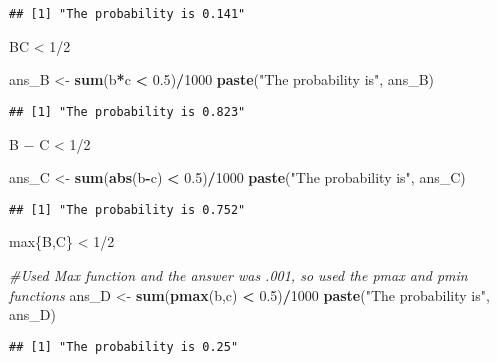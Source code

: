 \documentclass[
]{article}
\newenvironment{Shaded}{\begin{snugshade}}{\end{snugshade}}
\newcommand{\CommentTok}[1]{\textcolor[rgb]{0.56,0.35,0.01}{\textit{#1}}}
\newcommand{\DecValTok}[1]{\textcolor[rgb]{0.00,0.00,0.81}{#1}}
\newcommand{\FloatTok}[1]{\textcolor[rgb]{0.00,0.00,0.81}{#1}}
\newcommand{\KeywordTok}[1]{\textcolor[rgb]{0.13,0.29,0.53}{\textbf{#1}}}
\newcommand{\NormalTok}[1]{#1}
\newcommand{\OperatorTok}[1]{\textcolor[rgb]{0.81,0.36,0.00}{\textbf{#1}}}
\newcommand{\StringTok}[1]{\textcolor[rgb]{0.31,0.60,0.02}{#1}}
\begin{document}
\begin{verbatim}
## [1] "The probability is 0.141"
\end{verbatim}

BC \textless{} 1/2

\begin{Shaded}
\begin{Highlighting}[]
\NormalTok{ans_B <-}\StringTok{ }\KeywordTok{sum}\NormalTok{(b}\OperatorTok{*}\NormalTok{c }\OperatorTok{<}\StringTok{ }\FloatTok{0.5}\NormalTok{)}\OperatorTok{/}\DecValTok{1000}
\KeywordTok{paste}\NormalTok{(}\StringTok{"The probability is"}\NormalTok{, ans_B)}
\end{Highlighting}
\end{Shaded}

\begin{verbatim}
## [1] "The probability is 0.823"
\end{verbatim}

\textbar B − C\textbar{} \textless{} 1/2

\begin{Shaded}
\begin{Highlighting}[]
\NormalTok{ans_C <-}\StringTok{ }\KeywordTok{sum}\NormalTok{(}\KeywordTok{abs}\NormalTok{(b}\OperatorTok{-}\NormalTok{c) }\OperatorTok{<}\StringTok{ }\FloatTok{0.5}\NormalTok{)}\OperatorTok{/}\DecValTok{1000}
\KeywordTok{paste}\NormalTok{(}\StringTok{"The probability is"}\NormalTok{, ans_C)}
\end{Highlighting}
\end{Shaded}

\begin{verbatim}
## [1] "The probability is 0.752"
\end{verbatim}

max\{B,C\} \textless{} 1/2

\begin{Shaded}
\begin{Highlighting}[]
\CommentTok{#Used Max function and the answer was .001, so used the pmax and pmin functions}
\NormalTok{ans_D <-}\StringTok{ }\KeywordTok{sum}\NormalTok{(}\KeywordTok{pmax}\NormalTok{(b,c) }\OperatorTok{<}\StringTok{ }\FloatTok{0.5}\NormalTok{)}\OperatorTok{/}\DecValTok{1000}
\KeywordTok{paste}\NormalTok{(}\StringTok{"The probability is"}\NormalTok{, ans_D)}
\end{Highlighting}
\end{Shaded}

\begin{verbatim}
## [1] "The probability is 0.25"
\end{verbatim}
\end{document}
